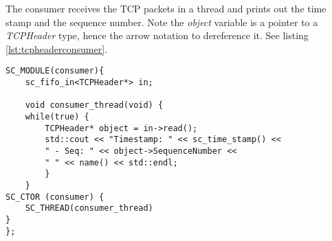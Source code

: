 \noindent The consumer receives the TCP packets in a thread and prints out the time stamp and the sequence number. Note the \textit{object} variable is a pointer to a \textit{TCPHeader} type, hence the arrow notation to dereference it. See listing \ref{lst:tcpheaderconsumer}.

\begin{lstlisting}[style=customc++, caption=Implementation of TCP consumer.,
label={lst:tcpheaderconsumer}]
SC_MODULE(consumer){
	sc_fifo_in<TCPHeader*> in;

	void consumer_thread(void) {
	while(true) {
		TCPHeader* object = in->read();
		std::cout << "Timestamp: " << sc_time_stamp() <<
		" - Seq: " << object->SequenceNumber <<
		" " << name() << std::endl;
		}
	}
SC_CTOR (consumer) {
	SC_THREAD(consumer_thread)
}
};
\end{lstlisting}
